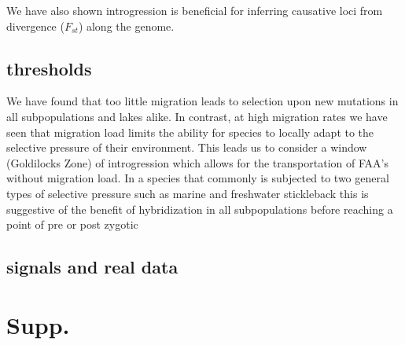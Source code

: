 \documentclass{article}
\newcommand{\plr}[1]{\todo[linecolor=blue,backgroundcolor=blue!25,bordercolor=blue]{#1}}
\begin{document}
We have also shown introgression is beneficial for inferring causative loci from divergence ($F_{st}$) along the genome. 




\subsection*{thresholds}

We have found that too little migration leads to selection upon new mutations in all subpopulations and lakes alike. 
In contrast, at high migration rates we have seen that migration load limits 
the ability for species to locally adapt to the selective pressure of their environment.
This leads us to consider a window (Goldilocks Zone) of introgression which allows for the transportation
of FAA's without migration load. In a species that commonly is subjected to two general types of selective pressure 
such as marine and freshwater stickleback this is suggestive of the benefit of hybridization in all subpopulations before
reaching a point of pre or post zygotic 



\subsection*{signals and real data}

\clearpage

{}

\section{Supp.}
\end{document}
